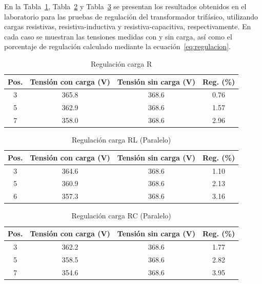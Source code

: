 En la Tabla~\ref{tab:regulacionR}, Tabla~\ref{tab:regulacionRL} y Tabla~\ref{tab:regulacionRC} se presentan los resultados obtenidos en el laboratorio para las pruebas de regulación del transformador trifásico, utilizando cargas resistivas, resistiva-inductiva y resistiva-capacitiva, respectivamente. En cada caso se muestran las tensiones medidas con y sin carga, así como el porcentaje de regulación calculado mediante la ecuación~\eqref{eq:regulacion}. %

\begin{table} %
\centering
\caption{Regulación carga R}
\label{tab:regulacionR}
\footnotesize
\setlength{\tabcolsep}{3pt} %
\begin{tabular}{|c|c|c|c|}
\hline
\textbf{Pos.} & \textbf{Tensión con carga (V)} & \textbf{Tensión sin carga (V)} & \textbf{Reg. (\%)} \\ \hline
3 & 365.8 & 368.6 & 0.76 \\ \hline
5 & 362.9 & 368.6 & 1.57 \\ \hline
7 & 358.0 & 368.6 & 2.96 \\ \hline
\end{tabular}
\end{table}

\begin{table} %
\centering
\caption{Regulación carga RL (Paralelo)}
\label{tab:regulacionRL}
\footnotesize
\setlength{\tabcolsep}{3pt}
\begin{tabular}{|c|c|c|c|}
\hline
\textbf{Pos.} & \textbf{Tensión con carga (V)} & \textbf{Tensión sin carga (V)} & \textbf{Reg. (\%)} \\ \hline
3 & 364.6 & 368.6 & 1.10 \\ \hline
5 & 360.9 & 368.6 & 2.13 \\ \hline
6 & 357.3 & 368.6 & 3.16 \\ \hline
\end{tabular}
\end{table}

\begin{table} %
\centering
\caption{Regulación carga RC (Paralelo)}
\label{tab:regulacionRC}
\footnotesize
\setlength{\tabcolsep}{3pt}
\begin{tabular}{|c|c|c|c|}
\hline
\textbf{Pos.} & \textbf{Tensión con carga (V)} & \textbf{Tensión sin carga (V)} & \textbf{Reg. (\%)} \\ \hline
3 & 362.2 & 368.6 & 1.77 \\ \hline
5 & 358.5 & 368.6 & 2.82 \\ \hline
7 & 354.6 & 368.6 & 3.95 \\ \hline
\end{tabular}
\end{table}

